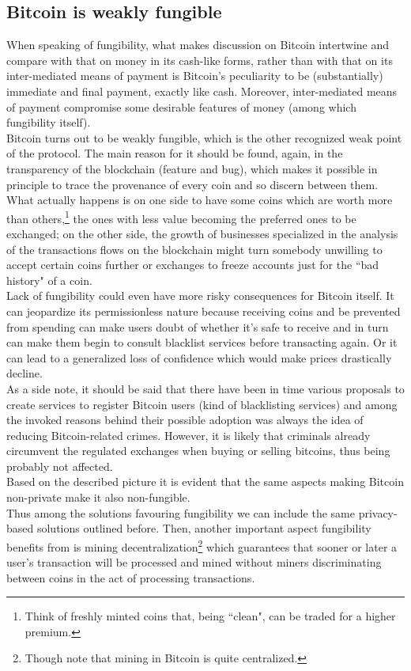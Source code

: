 \subsection{Bitcoin is weakly fungible}
\label{sec::weak_fun}
When speaking of fungibility, what makes discussion on Bitcoin intertwine and compare with that on money in its cash-like forms, rather than with that on its inter-mediated means of payment is Bitcoin's peculiarity to be (substantially) immediate and final payment, exactly like cash. Moreover, inter-mediated means of payment compromise some desirable features of money (among which fungibility itself).\\
Bitcoin turns out to be weakly fungible, which is the other recognized weak point of the protocol. The main reason for it should be found, again, in the transparency of the blockchain (feature and bug), which makes it possible in principle to trace the provenance of every coin and so discern between them. What actually happens is on one side to have some coins which are worth more than others,\footnote{Think of freshly minted coins that, being ``clean", can be traded for a higher premium.} the ones with less value becoming the preferred ones to be exchanged; on the other side, the growth of businesses specialized in the analysis of the transactions flows on the blockchain might turn somebody unwilling to accept certain coins further or exchanges to freeze accounts just for the ``bad history" of a coin.\\
Lack of fungibility could even have more risky consequences for Bitcoin itself. It can jeopardize its permissionless nature because receiving coins and be prevented from spending can make users doubt of whether it's safe to receive and in turn can make them begin to consult blacklist services before transacting again. Or it can lead to a generalized loss of confidence which would make prices drastically decline.\\
As a side note, it should be said that there have been in time various proposals to create services to register Bitcoin users (kind of blacklisting services) and among the invoked reasons behind their possible adoption was always the idea of reducing Bitcoin-related crimes. However, it is likely that criminals already circumvent the regulated exchanges when buying or selling bitcoins, thus being probably not affected.\\
Based on the described picture it is evident that the same aspects making Bitcoin non-private make it also non-fungible.\\
Thus among the solutions favouring fungibility we can include the same privacy-based solutions outlined before. Then, another important aspect fungibility benefits from is mining decentralization\footnote{Though note that mining in Bitcoin is quite centralized.} which guarantees that sooner or later a user's transaction will be processed and mined without miners discriminating between coins in the act of processing transactions.
